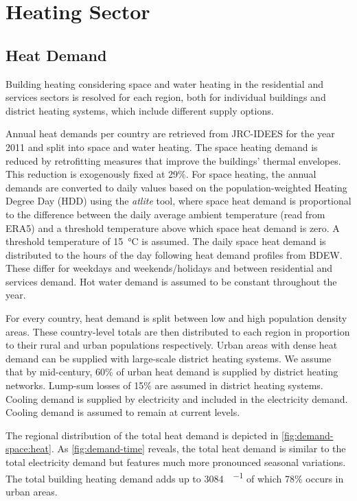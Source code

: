\section{Heating Sector}
\label{sec:si:heat}

\subsection{Heat Demand}
\label{sec:si:heat:demand}

Building heating considering space and water heating in the residential and
services sectors is resolved for each region, both for individual buildings and
district heating systems, which include different supply options.

Annual heat demands per country are retrieved from JRC-IDEES for
the year 2011 and split into space and water heating. The space heating demand
is reduced by retrofitting measures that improve the buildings' thermal
envelopes. This reduction is exogenously fixed at 29\%. For space
heating, the annual demands are converted to daily values based on the
population-weighted Heating Degree Day (HDD) using the \textit{atlite} tool,
 where space heat demand is proportional to the difference between the
daily average ambient temperature (read from ERA5) and a threshold
temperature above which space heat demand is zero. A threshold temperature of
\SI{15}{\celsius} is assumed. The daily space heat demand is distributed to the
hours of the day following heat demand profiles from BDEW. These differ
for weekdays and weekends/holidays and between residential and services demand.
Hot water demand is assumed to be constant throughout the year.

For every country, heat demand is split between low and high population density
areas. These country-level totals are then distributed to each region in
proportion to their rural and urban populations respectively. Urban areas with
dense heat demand can be supplied with large-scale district heating systems. We
assume that by mid-century, 60\% of urban heat demand is supplied by district heating
networks. Lump-sum losses of 15\% are assumed in district heating systems.
Cooling demand is supplied by electricity and included in the electricity
demand. Cooling demand is assumed to remain at current levels.

The regional distribution of the total heat demand is depicted in
\cref{fig:demand-space:heat}. As \cref{fig:demand-time} reveals, the total heat
demand is similar to the total electricity demand but features much more
pronounced seasonal variations. The total building heating demand adds up to
\SI{3084}{\twh\per\year} of which 78\% occurs in urban areas.

